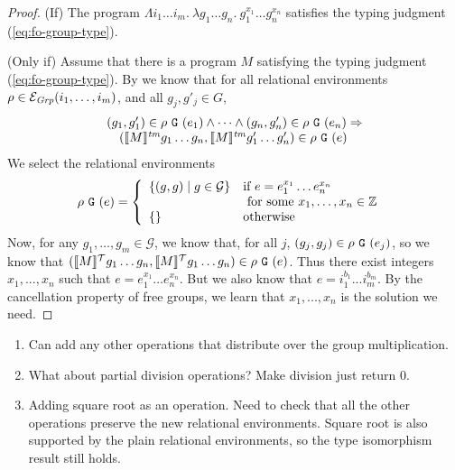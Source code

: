 
\begin{proof}
  (If) The program $\Lambda i_1\dots i_m.\ \lambda g_1\dots g_n.\
  g_1^{x_1}\dots g_n^{x_n}$ satisfies the typing judgment
  (\ref{eq:fo-group-type}).

  (Only if) Assume that there is a program $M$ satisfying the typing
  judgment (\ref{eq:fo-group-type}). By \thmref{thm:abstraction} we
  know that for all relational environments $\rho \in
  \mathcal{E}_{\mathit{Grp}}(i_1,\dots,i_m)$, and all $g_j,g'_j \in G$,
  \begin{displaymath}
    \begin{array}{l}
      (g_1,g'_1) \in \rho\ \tyPrimNm{G}\ (e_1) \land \dots \land (g_n,g'_n) \in \rho\ \tyPrimNm{G}\ (e_n) \Rightarrow \\
      \quad (\tmSem{M}g_1\dots g_n, \tmSem{M}g'_1\dots g'_n) \in \rho\ \tyPrimNm{G}\ (e)
    \end{array}
  \end{displaymath}
  We select the relational environments
  \begin{displaymath}
    \rho\ \tyPrimNm{G}\ (e) = \left\{
      \begin{array}{ll}
        \{(g,g) \sepbar g \in \mathcal{G} \} &
        \begin{array}[t]{@{}l}
          \textrm{if}\ e = e_1^{x_1}\dots e_n^{x_n} \\
          \textrm{ for some }x_1,\dots,x_n \in \mathbb{Z}
        \end{array}
        \\
        \{\} & \textrm{otherwise}
      \end{array}
    \right.
  \end{displaymath}
  Now, for any $g_1,\dots,g_m \in \mathcal{G}$, we know that, for all
  $j$, $(g_j,g_j) \in \rho\ \tyPrimNm{G}\ (e_j)$, so we know that
  $(\llbracket M \rrbracket^{\mathcal{T}}g_1\dots g_n, \llbracket M \rrbracket^{\mathcal{T}}g_1 \dots g_n) \in \rho\
  \texttt{G}\ (e)$. Thus there exist integers $x_1,...,x_n$ such
  that $e = e_1^{x_1}\dots e_n^{x_n}$. But we also know that $e =
  i_1^{b_1}...i_m^{b_m}$. By the cancellation property of free groups,
  we learn that $x_1,...,x_n$ is the solution we need.
\end{proof}

\begin{enumerate}
\item Can add any other operations that distribute over the group
  multiplication.
\item What about partial division operations? Make division just
  return $0$.
\item Adding square root as an operation. Need to check that all the
  other operations preserve the new relational environments. Square
  root is also supported by the plain relational environments, so the
  type isomorphism result still holds.
\end{enumerate}



